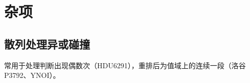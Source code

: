 \documentclass{article}
\begin{document}
\section{杂项}
\subsection{散列处理异或碰撞}
常用于处理判断出现偶数次（HDU6291），重排后为值域上的连续一段（洛谷P3792、YNOI）。



% 

% 


% 
% 
% 
\end{document}
